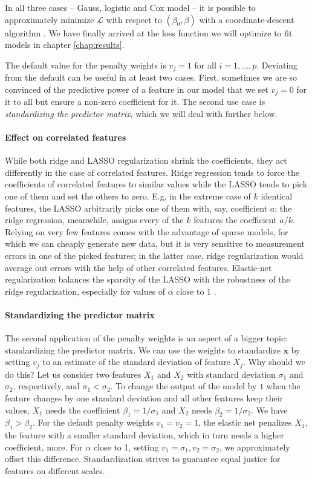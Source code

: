In all three cases -- Gauss, logistic and Cox model -- it is possible to approximately minimize 
$\mathcal{L}$ with respect to $(\beta_0, \beta)$ with a coordinate-descent algorithm 
\cite[section 2.3]{zerosum16}. We have finally arrived at the loss function we will optimize to 
fit models in chapter \ref{chap:results}.

The default value for the penalty weights is $v_j = 1$ for all $i = 1, \ldots, p$. Deviating from 
the default can be useful 
in at least two cases. First, sometimes we are so convinced of the predictive 
power of a feature in our model that we set $v_j = 0$ for it to all but ensure a non-zero 
coefficient for it. The second use case is \textit{standardizing the predictor matrix}, which 
we will deal with further below.

\paragraph{Effect on correlated features}
While both ridge and LASSO regularization shrink the coefficients, they act differently in the case 
of correlated features. Ridge regression tends to force the coefficients of correlated features to 
similar values while the LASSO tends to pick one of them and set the others to zero. E.g, in the 
extreme case of $k$ identical features, the LASSO arbitrarily picks one of them with, say, 
coefficient $a$; the ridge regression, meanwhile, assigns every of the $k$ features the coefficient 
$a/k$. Relying on very few features comes with the advantage of sparse models, for which we 
can cheaply generate new data, but it is very sensitive to measurement errors in one of the picked 
features; in the latter case, ridge regularization would average out errors with the help of other 
correlated features. Elastic-net regularization balances the sparsity of the LASSO with the 
robustness of the ridge regularization, especially for values of $\alpha$ close to $1$ 
\cite{elasticnet05}.


\paragraph{Standardizing the predictor matrix} 
The second application of the penalty weights is an aspect of a bigger topic: standardizing the
predictor matrix. We can use the weights to standardize $\mathbf{x}$ by setting $v_j$ to an estimate 
of the standard deviation of feature $X_j$. Why 
should we do this? Let us consider two features $X_1$ and $X_2$ with standard deviation $\sigma_1$
and $\sigma_2$, respectively, and $\sigma_1 < \sigma_2$. To change the output of the model by $1$ 
when the feature changes by 
one standard deviation and all other features keep their values, $X_1$ needs the coefficient 
$\beta_1 = 1/\sigma_1$ and $X_2$ needs $\beta_2 = 1/\sigma_2$. We have $\beta_1 > \beta_2$. For 
the default penalty weights $v_1 = v_2 = 1$, the elastic net penalizes $X_1$, the feature with a smaller 
standard deviation, which in turn needs a higher coefficient, more. For $\alpha$ close to 
\num{1}, setting $v_1 = \sigma_1, v_2 = \sigma_2$, we approximately offset this difference.
Standardization strives to guarantee equal justice for features 
on different scales. 

